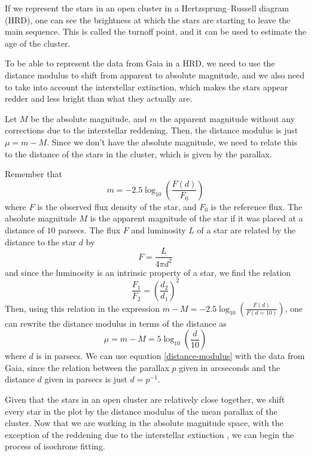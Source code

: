 \documentclass[twocolumn]{revtex4}
\begin{document}
If we represent the stars in an open cluster in a Hertzsprung–Russell diagram (HRD), one can see the brightness at which the stars are starting to leave the main sequence. This is called the turnoff point, and it can be used to estimate the age of the cluster.

To be able to represent the data from Gaia in a HRD, we need to use the distance modulus to shift from apparent to absolute magnitude, and we also need to take into account the interstellar extinction, which makes the stars appear redder and less bright than what they actually are.

Let $M$ be the absolute magnitude, and $m$ the apparent magnitude without any corrections due to the interstellar reddening. Then, the distance modulus is just $\mu = m - M$. Since we don't have the absolute magnitude, we need to relate this to the distance of the stars in the cluster, which is given by the parallax.

Remember that
\[m = -2.5 \log_{10} \left( \frac{F(d)}{F_0} \right) \]
where $F$ is the observed flux density of the star, and $F_0$ is the reference flux. %
The absolute magnitude $M$ is the apparent magnitude of the star if it was placed at a distance of $10$ parsecs. The flux $F$ and luminosity $L$ of a star are related by the distance to the star $d$ by
\[F = \frac{L}{4 \pi d^2}\]
and since the luminosity is an intrinsic property of a star, we find the relation
\begin{equation}
\frac{F_1}{F_2} = \left( \frac{d_2}{d_1} \right)^2
\end{equation}
Then, using this relation in the expression $m - M = -2.5 \log_{10} \left( \frac{F(d)}{F(d=10)} \right)$, one can rewrite the distance modulus in terms of the distance as
\begin{equation}
\label{distance-modulus}
\mu = m - M = 5 \log_{10} \left( \frac{d}{10} \right)
\end{equation}
where $d$ is in parsecs. We can use equation \ref{distance-modulus} with the data from Gaia, since the relation between the parallax $p$ given in arcseconds and the distance $d$ given in parsecs is just $d = p^{-1}$.

Given that the stars in an open cluster are relatively close together, we shift every star in the plot by the distance modulus of the mean parallax of the cluster. Now that we are working in the absolute magnitude space, with the exception of the reddening due to the interstellar extinction , we can begin the process of isochrone fitting.
\end{document}
